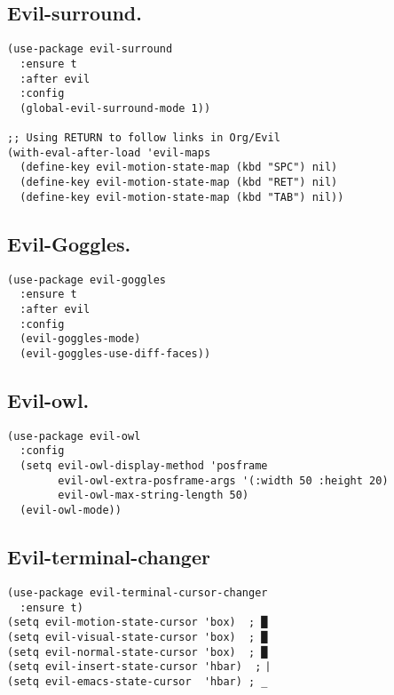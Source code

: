\documentclass[11pt]{article}
\begin{document}
\subsection{Evil-surround.}
\label{sec:org21c8c28}
\begin{verbatim}
(use-package evil-surround
  :ensure t
  :after evil
  :config
  (global-evil-surround-mode 1))

;; Using RETURN to follow links in Org/Evil 
(with-eval-after-load 'evil-maps
  (define-key evil-motion-state-map (kbd "SPC") nil)
  (define-key evil-motion-state-map (kbd "RET") nil)
  (define-key evil-motion-state-map (kbd "TAB") nil))
\end{verbatim}
\subsection{Evil-Goggles.}
\label{sec:org8e4b9a3}
\begin{verbatim}
(use-package evil-goggles
  :ensure t
  :after evil
  :config
  (evil-goggles-mode)
  (evil-goggles-use-diff-faces))
\end{verbatim}
\subsection{Evil-owl.}
\label{sec:orgddccdf0}
\begin{verbatim}
(use-package evil-owl
  :config
  (setq evil-owl-display-method 'posframe
        evil-owl-extra-posframe-args '(:width 50 :height 20)
        evil-owl-max-string-length 50)
  (evil-owl-mode))
\end{verbatim}
\subsection{Evil-terminal-changer}
\label{sec:org27bb823}
\begin{verbatim}
(use-package evil-terminal-cursor-changer
  :ensure t)
(setq evil-motion-state-cursor 'box)  ; █
(setq evil-visual-state-cursor 'box)  ; █
(setq evil-normal-state-cursor 'box)  ; █
(setq evil-insert-state-cursor 'hbar)  ; ⎸
(setq evil-emacs-state-cursor  'hbar) ; _
\end{verbatim}
\end{document}
